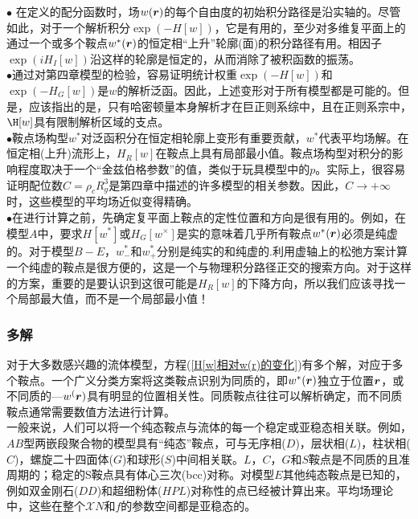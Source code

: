 $\bullet$ 在定义的配分函数时，场$w(\bm{r})$的每个自由度的初始积分路径是沿实轴的。尽管如此，对于一个解析积分$\exp(-H[w])$，它是有用的，至少对多维复平面上的通过一个或多个鞍点$w^*(\bm{r})$的恒定相“上升”轮廓(面)的积分路径有用。相因子$\exp(iH_I[w])$沿这样的轮廓是恒定的，从而消除了被积函数的振荡。\\

 $\bullet$通过对第四章模型的检验，容易证明统计权重$\exp(−H[w])$和$\exp(−H_G[w])$是$w$的解析泛函。因此，上述变形对于所有模型都是可能的。但是，应该指出的是，只有哈密顿量本身解析才在巨正则系综中，且在正则系宗中，$\H[w]$具有限制解析区域的支点。\\

$\bullet$鞍点场构型$w^*$对泛函积分在恒定相轮廓上变形有重要贡献，$w^*$代表平均场解。在恒定相(上升)流形上，$H_R[w]$在鞍点上具有局部最小值。鞍点场构型对积分的影响程度取决于一个“金兹伯格参数”的值，类似于玩具模型中的$p$。实际上，很容易证明配位数$C=\rho_cR_g^3$是第四章中描述的许多模型的相关参数。因此，$C\rightarrow +\infty$时，这些模型的平均场近似变得精确。\\

$\bullet$在进行计算之前，先确定复平面上鞍点的定性位置和方向是很有用的。例如，在模型$A$中，要求$H[w^*]$或$H_G[w^×]$是实的意味着几乎所有鞍点$w^*(\bm{r})$必须是纯虚的。对于模型$B-E$，$w_{-}^*$和$w_{+}^{*}$分别是纯实的和纯虚的.利用虚轴上的松弛方案计算一个纯虚的鞍点是很方便的，这是一个与物理积分路径正交的搜索方向。对于这样的方案，重要的是要认识到这很可能是$H_R[w]$的下降方向，所以我们应该寻找一个局部最大值，而不是一个局部最小值！\\
\subsubsection{多解}
对于大多数感兴趣的流体模型，方程(\ref{H[w]相对w(r)的变化})有多个解，对应于多个鞍点。一个广义分类方案将这类鞍点识别为同质的，即$w^*(\bm{r})$独立于位置$\bm{r}$，或不同质的—$w^(\bm{r})$具有明显的位置相关性。同质鞍点往往可以解析确定，而不同质鞍点通常需要数值方法进行计算。\\

一般来说，人们可以将一个纯态鞍点与流体的每一个稳定或亚稳态相关联。例如，$AB$型两嵌段聚合物的模型具有“纯态”鞍点，可与无序相($D$)，层状相($L$)，柱状相($C$)，螺旋二十四面体($G$)和球形($S$)中间相关联。$L$，$C$，$G$和$S$鞍点是不同质的且准周期的；稳定的S鞍点具有体心三次(bcc)对称。对模型$E$其他纯态鞍点是已知的，例如双金刚石($DD$)和超细粉体($HPL$)对称性的点已经被计算出来。平均场理论中，这些在整个$\mathcal{X}N$和$f$的参数空间都是亚稳态的。\\

